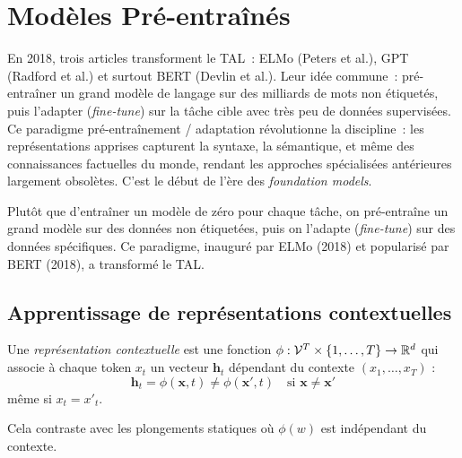 \chapter{Mod\`eles Pr\'e-entra\^in\'es}
\label{ch:pretraines}

En 2018, trois articles transforment le TAL~: ELMo (Peters et al.), GPT (Radford et al.) et surtout BERT (Devlin et al.). Leur id\'ee commune~: pr\'e-entra\^iner un grand mod\`ele de langage sur des milliards de mots non \'etiquet\'es, puis l'adapter (\emph{fine-tune}) sur la t\^ache cible avec tr\`es peu de donn\'ees supervis\'ees. Ce paradigme \og pr\'e-entra\^inement / adaptation \fg r\'evolutionne la discipline~: les repr\'esentations apprises capturent la syntaxe, la s\'emantique, et m\^eme des connaissances factuelles du monde, rendant les approches sp\'ecialis\'ees ant\'erieures largement obsol\`etes. C'est le d\'ebut de l'\`ere des \emph{foundation models}.

\begin{intuition}[title=\textbf{Le paradigme pr\'e-entra\^inement / adaptation}]
Plut\^ot que d'entra\^iner un mod\`ele de z\'ero pour chaque t\^ache, on
pr\'e-entra\^ine un grand mod\`ele sur des donn\'ees non \'etiquet\'ees, puis on
l'adapte (\emph{fine-tune}) sur des donn\'ees sp\'ecifiques. Ce paradigme,
inaugur\'e par ELMo (2018) et popularis\'e par BERT (2018), a transform\'e le TAL.
\end{intuition}

\section{Apprentissage de repr\'esentations contextuelles}
\label{sec:pre:contextuelles}

\begin{definition}
Une \emph{repr\'esentation contextuelle} est une fonction
$\phi : \mathcal{V}^T \times \{1, \ldots, T\} \to \mathbb{R}^d$ qui associe \`a
chaque token $x_t$ un vecteur $\mathbf{h}_t$ d\'ependant du contexte
$(x_1, \ldots, x_T)$ :
\[
\mathbf{h}_t = \phi(\mathbf{x}, t) \neq \phi(\mathbf{x}', t) \quad \text{si } \mathbf{x} \neq \mathbf{x}'
\]
m\^eme si $x_t = x'_t$.
\end{definition}

Cela contraste avec les plongements statiques o\`u $\phi(w)$ est ind\'ependant
du contexte.

